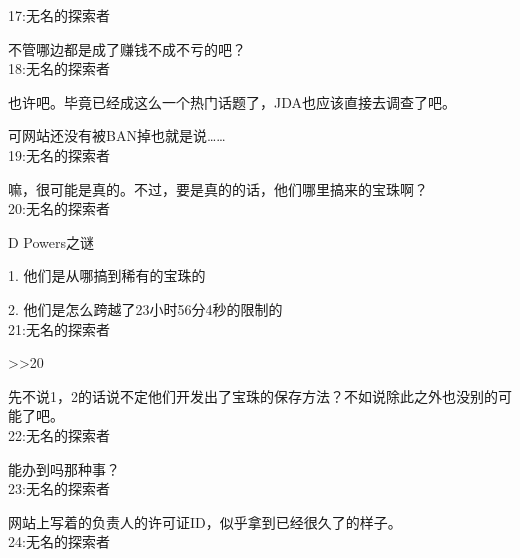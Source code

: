 17:无名的探索者

不管哪边都是成了赚钱不成不亏的吧？\\

18:无名的探索者

也许吧。毕竟已经成这么一个热门话题了，JDA也应该直接去调查了吧。

可网站还没有被BAN掉也就是说……\\

19:无名的探索者

嘛，很可能是真的。不过，要是真的的话，他们哪里搞来的宝珠啊？\\

20:无名的探索者

D Powers之谜

1. 他们是从哪搞到稀有的宝珠的

2. 他们是怎么跨越了23小时56分4秒的限制的\\

21:无名的探索者

>>20

先不说1，2的话说不定他们开发出了宝珠的保存方法？不如说除此之外也没别的可能了吧。\\

22:无名的探索者

能办到吗那种事？\\

23:无名的探索者

网站上写着的负责人的许可证ID，似乎拿到已经很久了的样子。\\

24:无名的探索者

